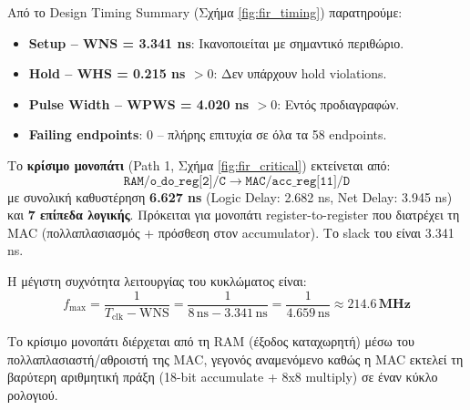 \documentclass[12pt]{article}
\begin{document}
Από το Design Timing Summary (Σχήμα \ref{fig:fir_timing}) παρατηρούμε:
\begin{itemize}
    \item \textbf{Setup -- WNS = 3.341 ns}: Ικανοποιείται με σημαντικό περιθώριο.
    \item \textbf{Hold -- WHS = 0.215 ns $> 0$}: Δεν υπάρχουν hold violations.
    \item \textbf{Pulse Width -- WPWS = 4.020 ns $> 0$}: Εντός προδιαγραφών.
    \item \textbf{Failing endpoints}: 0 -- πλήρης επιτυχία σε όλα τα 58 endpoints.
\end{itemize}

Το \textbf{κρίσιμο μονοπάτι} (Path 1, Σχήμα \ref{fig:fir_critical}) εκτείνεται από:
\[
    \texttt{RAM/o\_do\_reg[2]/C} \;\longrightarrow\; \texttt{MAC/acc\_reg[11]/D}
\]
με συνολική καθυστέρηση \textbf{6.627 ns} (Logic Delay: 2.682 ns, Net Delay: 3.945 ns) και \textbf{7 επίπεδα λογικής}. Πρόκειται για μονοπάτι register-to-register που διατρέχει τη MAC (πολλαπλασιασμός + πρόσθεση στον accumulator). Το slack του είναι 3.341 ns.

Η μέγιστη συχνότητα λειτουργίας του κυκλώματος είναι:
\[
    f_{\max} = \frac{1}{T_{\text{clk}} - \text{WNS}} = \frac{1}{8\,\text{ns} - 3.341\,\text{ns}} = \frac{1}{4.659\,\text{ns}} \approx \mathbf{214.6\,\text{MHz}}
\]

Το κρίσιμο μονοπάτι διέρχεται από τη RAM (έξοδος καταχωρητή) μέσω του πολλαπλασιαστή/αθροιστή της MAC, γεγονός αναμενόμενο καθώς η MAC εκτελεί τη βαρύτερη αριθμητική πράξη (18-bit accumulate + 8x8 multiply) σε έναν κύκλο ρολογιού.
\end{document}
